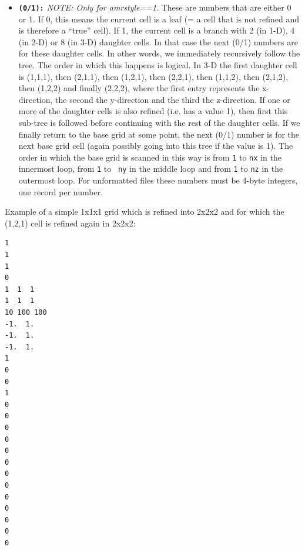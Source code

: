 \documentclass{report}
\newenvironment{asciibox}%
  {\begin{list}{}{%
    \setlength{\topsep}{0.5em}%
    \setlength{\parskip}{0em}%
    \setlength{\parsep}{0em}%
    \setlength{\itemsep}{0em}%
    \setlength{\rightmargin}{0em}%
    \setlength{\leftmargin}{3.0em}%
    \setlength{\labelsep}{1em}%
    \setlength{\labelwidth}{2em}%
  }\normalfont\footnotesize\item}
  {\end{list}}
\begin{document}
\begin{itemize}
\item[] {\small\tt\bf (0/1):} {\em NOTE: Only for amrstyle==1}. These are
  numbers that are either 0 or 1. If 0, this means the current cell is a
  leaf (= a cell that is not refined and is therefore a ``true'' cell). If
  1, the current cell is a branch with 2 (in 1-D), 4 (in 2-D) or 8 (in 3-D)
  daughter cells. In that case the next (0/1) numbers are for these daughter
  cells. In other words, we immediately recursively follow the tree. The
  order in which this happens is logical. In 3-D the first daughter cell is
  (1,1,1), then (2,1,1), then (1,2,1), then (2,2,1), then (1,1,2), then
  (2,1,2), then (1,2,2) and finally (2,2,2), where the first entry
  represents the x-direction, the second the y-direction and the third the
  z-direction. If one or more of the daughter cells is also refined
  (i.e. has a value 1), then first this sub-tree is followed before
  continuing with the rest of the daughter cells. If we finally return to
  the base grid at some point, the next (0/1) number is for the next base
  grid cell (again possibly going into this tree if the value is 1). The
  order in which the base grid is scanned in this way is from {\small\tt 1}
  to {\small\tt nx} in the innermost loop, from {\small\tt 1} to {\small\tt
    ny} in the middle loop and from {\small\tt 1} to {\small\tt nz} in the
  outermost loop. For unformatted files these numbers must be 4-byte
  integers, one record per number.
\end{itemize}


Example of a simple 1x1x1 grid which is refined into 2x2x2 and for
which the (1,2,1) cell is refined again in 2x2x2:
\begin{asciibox}\begin{verbatim}
1
1
1
0
1  1  1
1  1  1
10 100 100
-1.  1.
-1.  1.
-1.  1.
1
0
0
1
0
0
0
0
0
0
0
0
0
0
0
0
0
\end{verbatim}\end{asciibox}
\end{document}
